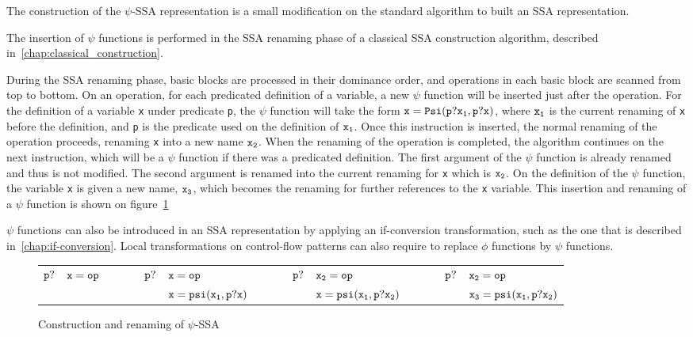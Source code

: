 
The construction of the $\psi$-SSA representation is a small
modification on the standard algorithm to built an SSA representation.

The insertion of $\psi$ functions is performed in the SSA renaming
phase of a classical SSA construction algorithm, described
in~\ref{chap:classical_construction}.

During the SSA renaming phase, basic blocks are processed in their
dominance order, and operations in each basic block are scanned from
top to bottom. On an operation, for each predicated definition of a
variable, a new $\psi$ function will be inserted just after the
operation. For the definition of a variable {\tt x} under predicate
{\tt p}, the $\psi$ function will take the form ${\tt x = Psi(p?x_1,
  p?x)}$, where ${\tt x_1}$ is the current renaming of {\tt x} before
the definition, and {\tt p} is the predicate used on the definition of
${\tt x_1}$. Once this instruction is inserted, the normal renaming of
the operation proceeds, renaming {\tt x} into a new name ${\tt
  x_2}$. When the renaming of the operation is completed, the
algorithm continues on the next instruction, which will be a $\psi$
function if there was a predicated definition. The first argument of
the $\psi$ function is already renamed and thus is not modified. The
second argument is renamed into the current renaming for {\tt x}
which is ${\tt x_2}$. On the definition of the $\psi$ function, the
variable {\tt x} is given a new name, ${\tt x_3}$, which becomes the
renaming for further references to the {\tt x} variable. This
insertion and renaming of a $\psi$ function is shown on
figure~\ref{fig:psi_ssa_construct}

$\psi$ functions can also be introduced in an SSA representation by
applying an if-conversion transformation, such as the one that is
described in~\ref{chap:if-conversion}. Local transformations on
control-flow patterns can also require to replace $\phi$ functions by
$\psi$ functions.

\begin{figure}
\begin{center}
\footnotesize
\begin{tabular}{lllllllllll}
${\tt p?}$ & ${\tt x = op}$ & \ \ \ \  & ${\tt p?}$ & ${\tt x = op}$           & \ \ \ \  & ${\tt p?}$ & ${\tt x_2 = op}$           & \ \ \ \  & ${\tt p?}$ & ${\tt x_2 = op}$ \\
           &                &          &            & ${\tt x = psi(x_1, p?x)}$ &           &           & ${\tt x = psi(x_1, p?x_2)}$ &          &           & ${\tt x_3 = psi(x_1, p?x_2)}$ \\
\end{tabular}
\caption{Construction and renaming of $\psi$-SSA}
\label{fig:psi_ssa_construct}
\end{center}
\end{figure}


